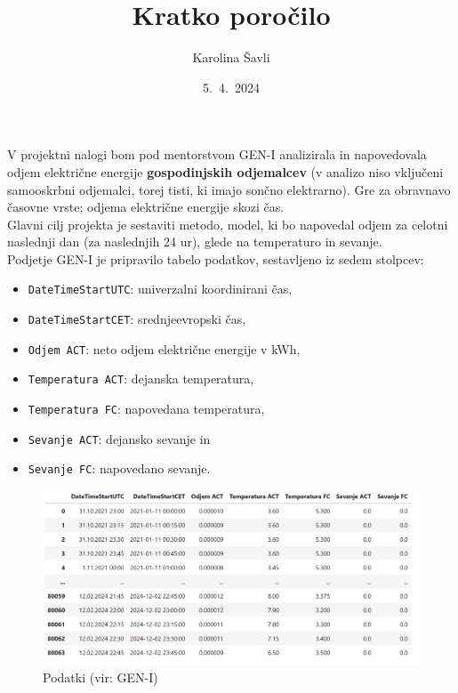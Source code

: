 \documentclass[a4paper, 10pt]{article}
\begin{document}
\title{\textbf{\LARGE{Kratko poročilo}}}
\author{Karolina Šavli}
\date{5.\ 4.\ 2024}

\maketitle


\noindent V projektni nalogi bom pod mentorstvom GEN-I analizirala in napovedovala odjem električne energije 
\textbf{gospodinjskih odjemalcev} (v analizo niso vključeni samooskrbni odjemalci, torej tisti, 
ki imajo sončno elektrarno). Gre za obravnavo časovne vrste; odjema električne energije skozi čas. \\

\noindent Glavni cilj projekta je sestaviti metodo, model, ki bo napovedal odjem za celotni naslednji dan (za naslednjih 24 ur), glede na temperaturo in sevanje. \\

\noindent Podjetje GEN-I je pripravilo tabelo podatkov, sestavljeno iz sedem stolpcev:
\begin{itemize}
    \item  \texttt{DateTimeStartUTC}: univerzalni koordinirani čas,
    \item  \texttt{DateTimeStartCET}: srednjeevropski čas,
    \item  \texttt{Odjem ACT}: neto odjem električne energije v kWh,
    \item  \texttt{Temperatura ACT}: dejanska temperatura, 
    \item  \texttt{Temperatura FC}: napovedana temperatura,
    \item  \texttt{Sevanje ACT}: dejansko sevanje in
    \item  \texttt{Sevanje FC}: napovedano sevanje. 
\end{itemize}

\begin{figure}[h!]
    \centering
    \caption{Podatki (vir: GEN-I)}\par\medskip
    \includegraphics[width=\textwidth]{tabela.png}
\end{figure}
\end{document}
